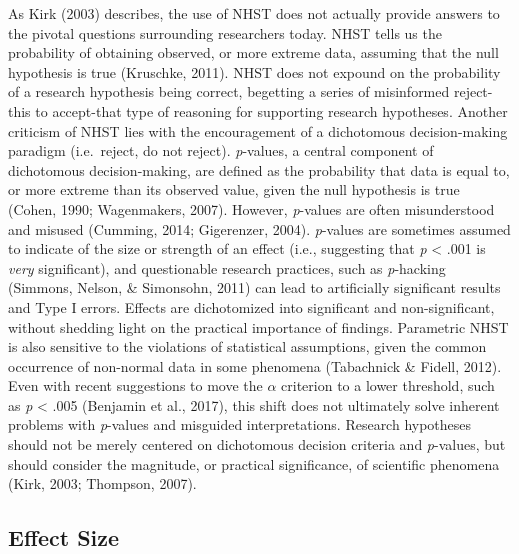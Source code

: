 \documentclass[english,man]{apa6}
\theoremstyle{definition}
\theoremstyle{definition}
\theoremstyle{definition}
\theoremstyle{remark}
\begin{document}
As Kirk (2003) describes, the use of NHST does not actually provide
answers to the pivotal questions surrounding researchers today. NHST
tells us the probability of obtaining observed, or more extreme data,
assuming that the null hypothesis is true (Kruschke, 2011). NHST does
not expound on the probability of a research hypothesis being correct,
begetting a series of misinformed reject-this to accept-that type of
reasoning for supporting research hypotheses. Another criticism of NHST
lies with the encouragement of a dichotomous decision-making paradigm
(i.e.~reject, do not reject). \emph{p}-values, a central component of
dichotomous decision-making, are defined as the probability that data is
equal to, or more extreme than its observed value, given the null
hypothesis is true (Cohen, 1990; Wagenmakers, 2007). However,
\emph{p}-values are often misunderstood and misused (Cumming, 2014;
Gigerenzer, 2004). \emph{p}-values are sometimes assumed to indicate of
the size or strength of an effect (i.e., suggesting that \emph{p}
\textless{} .001 is \emph{very} significant), and questionable research
practices, such as \emph{p}-hacking (Simmons, Nelson, \& Simonsohn,
2011) can lead to artificially significant results and Type I errors.
Effects are dichotomized into significant and non-significant, without
shedding light on the practical importance of findings. Parametric NHST
is also sensitive to the violations of statistical assumptions, given
the common occurrence of non-normal data in some phenomena (Tabachnick
\& Fidell, 2012). Even with recent suggestions to move the \(\alpha\)
criterion to a lower threshold, such as \emph{p} \textless{} .005
(Benjamin et al., 2017), this shift does not ultimately solve inherent
problems with \emph{p}-values and misguided interpretations. Research
hypotheses should not be merely centered on dichotomous decision
criteria and \emph{p}-values, but should consider the magnitude, or
practical significance, of scientific phenomena (Kirk, 2003; Thompson,
2007).

\subsection{Effect Size}\label{effect-size}
\end{document}
